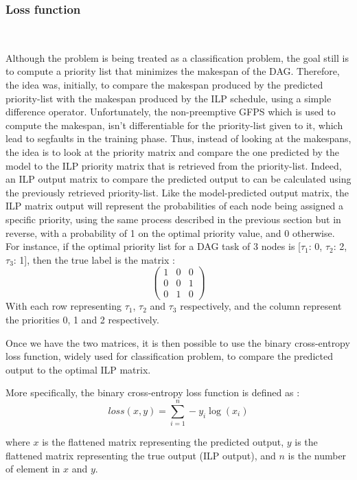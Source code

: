 \subsubsection{Loss function}
~
\label{sec:loss_design}

Although the problem is being treated as a classification problem,
the goal still is to compute a priority list that minimizes the makespan
of the DAG.
Therefore, the idea was, initially, to compare the makespan
produced by the predicted priority-list with the makespan
produced by the ILP schedule, using a simple difference operator.
Unfortunately, the non-preemptive GFPS which is used to compute the makespan,
isn't differentiable for the priority-list given to it,
which lead to segfaults in the training phase.
Thus, instead of looking at the makespans,
the idea is to look at the priority matrix 
and compare the one predicted by the model to
the ILP priority matrix that is retrieved from the priority-list.
Indeed, an ILP output matrix to compare the predicted output to
can be calculated using the previously retrieved priority-list.
Like the model-predicted output matrix,
the ILP matrix output will represent the probabilities
of each node being assigned a specific priority, using the 
same process described in the previous section but in reverse, with a probability of 1 
on the optimal priority value, and 0 otherwise. 
For instance, if the optimal priority list for a DAG task of 3 nodes 
is [$\tau_1$: 0, $\tau_2$: 2, $\tau_3$: 1],
then the true label is the matrix :
$$
\begin{pmatrix}
    1 & 0 & 0\\
    0 & 0 & 1\\
    0 & 1 & 0
\end{pmatrix}
$$
With each row representing $\tau_1$, $\tau_2$ and $\tau_3$ respectively,
and the column represent the priorities 0, 1 and 2 respectively.

Once we have the two matrices, 
it is then possible to use the binary cross-entropy loss function,
widely used for classification problem,
to compare the predicted output to the optimal ILP matrix.

More specifically, the binary cross-entropy loss function is defined as :
\begin{equation}
    loss(x, y) = \sum_{i=1}^{n} -y_i\log(x_i)
\end{equation}
    
where $x$ is the flattened matrix representing the predicted output,
$y$ is the flattened matrix representing the true output (ILP output),
and $n$ is the number of element in $x$ and $y$.



